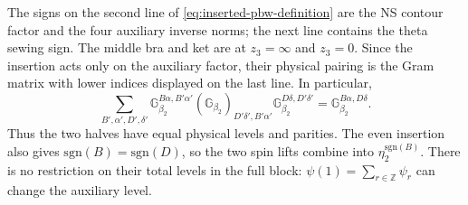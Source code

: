 \documentclass[11pt]{article}
\numberwithin{equation}{section}
\begin{document}
The signs on the second line of \eqref{eq:inserted-pbw-definition} are
the NS contour factor and the four auxiliary inverse norms; the next line
contains the theta sewing sign. The middle bra and ket are at
$z_3=\infty$ and $z_3=0$. Since the insertion acts only on the auxiliary
factor, their physical pairing is the Gram matrix with lower indices
displayed on the last line. In particular,
\begin{equation}
 \sum_{B',\alpha',D',\delta'}
 \mathbb G_{\beta_2}^{B\alpha,B'\alpha'}
 (\mathbb G_{\beta_2})_{D'\delta',B'\alpha'}
 \mathbb G_{\beta_2}^{D\delta,D'\delta'}
 =\mathbb G_{\beta_2}^{B\alpha,D\delta}.
 \label{eq:inserted-pbw-collapse}
\end{equation}
Thus the two halves have equal physical levels and parities.
The even insertion also gives $\mathrm{sgn}(B)=\mathrm{sgn}(D)$, so the
two spin lifts combine into $\eta_2^{\mathrm{sgn}(B)}$.
There is no restriction on their total levels in the full block:
$\psi(1)=\sum_{r\in\mathbb Z}\psi_r$ can change the auxiliary level.
\end{document}
